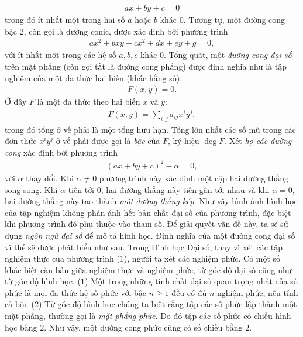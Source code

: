 \begin{multicols}{2}
	\begin{align*}
		ax+by+c=0
	\end{align*}
	trong đó ít nhất một trong hai số $a$ hoặc $b$ khác $0$. Tương tự, một đường cong bậc $2$, còn gọi là đường conic, được xác định bởi phương trình
	\begin{align*}
		ax^2+bxy+cx^2+dx+ey+g=0,
	\end{align*}
	với ít nhất một trong các hệ số $a,b,c$ khác $0$.
	\vskip 0.1cm
	Tổng quát, một {\em đường cong đại số} trên mặt phẳng (còn gọi tắt là đường cong phẳng) được định nghĩa như là tập nghiệm của một đa thức hai biến (khác hằng số):
	\begin{align*}
		F(x,y)=0. \tag{$1$}
	\end{align*}
	Ở đây $F$ là một đa thức theo hai biến $x$ và $y$:
	\begin{align*}
		F(x,y)=\sum_{i,j} a_{ij}x^iy^j,
	\end{align*}
	trong đó tổng ở vế phải là một tổng hữu hạn. Tổng lớn nhất các số mũ trong các đơn thức $x^iy^j$ ở vế phải được gọi là {\em bậc} của $F$, ký hiệu $\deg F$. 
	\vskip 0.1cm
	Xét {\em họ các đường cong} xác định bởi phương trình
	\begin{align*}
		(ax+by+c)^2-\alpha=0,
	\end{align*}
	với $\alpha$ thay đổi. Khi $\alpha\neq 0$ phương trình này xác định một cặp hai đường thẳng song song. Khi $\alpha$ tiến tới $0$, hai đường thẳng này tiến gần tới nhau và khi $\alpha=0$, hai đường thẳng này tạo thành {\em một đường thẳng kép}. 
	\vskip 0.1cm
	Như vậy hình ảnh hình học của tập nghiệm không phản ánh hết bản chất đại số của phương trình, đặc biệt khi phương trình đó phụ thuộc vào tham số. Để giải quyết vấn đề này, ta sẽ sử dụng {\em ngôn ngữ đại số} để mô tả hình học. Định nghĩa của một đường cong đại số vì thế sẽ được phát biểu như sau. 
	\vskip 0.1cm
	\vskip 0.1cm
	Trong Hình học Đại số, thay vì xét các tập nghiệm thực của phương trình ($1$), người ta xét các nghiệm phức. Có một số khác biệt căn bản giữa nghiệm thực và nghiệm phức, từ góc độ đại số cũng như từ góc độ hình học. 
	\vskip 0.1cm
	($1$) Một trong những tính chất đại số quan trọng nhất của số phức là mọi đa thức hệ số phức với bậc $n\geq 1$ đều có đủ $n$ nghiệm phức, nếu tính cả bội.   
	\vskip 0.1cm 
	($2$) Từ góc độ hình học chúng ta biết rằng tập các số phức lập thành một mặt phẳng, thường gọi là {\em mặt phẳng phức}. Do đó tập các số phức có chiều hình học bằng $2$. Như vậy, một đường cong phức cũng có số chiều bằng $2$. 

\end{multicols}
